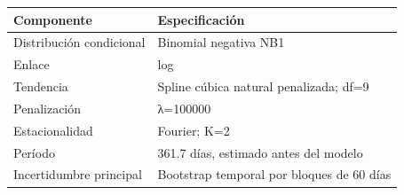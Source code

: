 \begin{tabular}{ll}
\toprule
Componente & Especificación \\
\midrule
Distribución condicional & Binomial negativa NB1 \\
Enlace & log \\
Tendencia & Spline cúbica natural penalizada; df=9 \\
Penalización & λ=100000 \\
Estacionalidad & Fourier; K=2 \\
Período & 361.7 días, estimado antes del modelo \\
Incertidumbre principal & Bootstrap temporal por bloques de 60 días \\
\bottomrule
\end{tabular}
